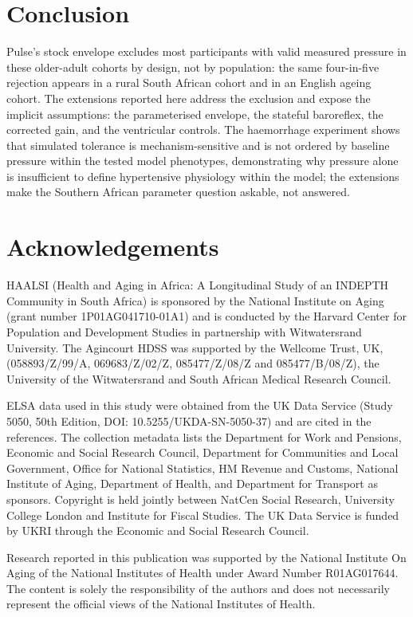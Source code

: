 \documentclass[preprint,12pt,nopreprintline]{elsarticle}
\begin{document}
\section{Conclusion}

Pulse's stock envelope excludes most participants with valid measured pressure in these older-adult cohorts by design, not by population: the same four-in-five rejection appears in a rural South African cohort and in an English ageing cohort. The extensions reported here address the exclusion and expose the implicit assumptions: the parameterised envelope, the stateful baroreflex, the corrected gain, and the ventricular controls. The haemorrhage experiment shows that simulated tolerance is mechanism-sensitive and is not ordered by baseline pressure within the tested model phenotypes, demonstrating why pressure alone is insufficient to define hypertensive physiology within the model; the extensions make the Southern African parameter question askable, not answered.

\section*{Acknowledgements}
HAALSI (Health and Aging in Africa: A Longitudinal Study of an INDEPTH Community in South Africa) is sponsored by the National Institute on Aging (grant number 1P01AG041710-01A1) and is conducted by the Harvard Center for Population and Development Studies in partnership with Witwatersrand University. The Agincourt HDSS was supported by the Wellcome Trust, UK, (058893/Z/99/A, 069683/Z/02/Z, 085477/Z/08/Z and 085477/B/08/Z), the University of the Witwatersrand and South African Medical Research Council.

ELSA data used in this study were obtained from the UK Data Service (Study 5050, 50th Edition, DOI: 10.5255/UKDA-SN-5050-37) and are cited in the references. The collection metadata lists the Department for Work and Pensions, Economic and Social Research Council, Department for Communities and Local Government, Office for National Statistics, HM Revenue and Customs, National Institute of Aging, Department of Health, and Department for Transport as sponsors. Copyright is held jointly between NatCen Social Research, University College London and Institute for Fiscal Studies. The UK Data Service is funded by UKRI through the Economic and Social Research Council.

Research reported in this publication was supported by the National Institute On Aging of the National Institutes of Health under Award Number R01AG017644. The content is solely the responsibility of the authors and does not necessarily represent the official views of the National Institutes of Health.
\end{document}
